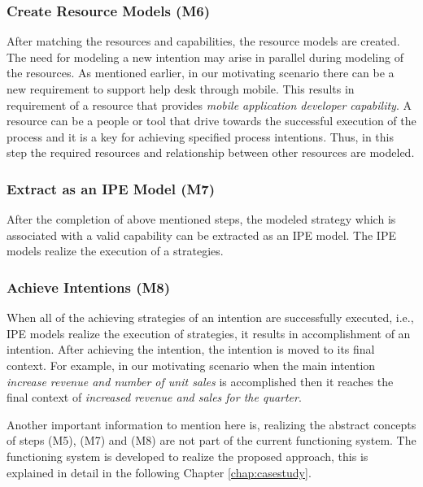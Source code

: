 \subsubsection{Create Resource Models (M6)}  
After matching the resources and capabilities, the resource models are created. The need for modeling a new intention may arise in parallel during modeling of the resources. As mentioned earlier, in our motivating scenario there can be a new requirement to support help desk through mobile. This results in requirement of a resource that provides \textit{mobile application developer capability}. A resource can be a people or tool that drive towards the successful execution of the process and it is a key for achieving specified process intentions. Thus, in this step the required resources and relationship between other resources are modeled.  

\subsubsection{Extract as an IPE Model (M7)}  
After the completion of above mentioned steps, the modeled strategy which is associated with a valid capability can be extracted as an IPE model. The IPE models realize the execution of a strategies. 

\subsubsection{Achieve Intentions (M8)}
When all of the achieving strategies of an intention are successfully executed, i.e., IPE models realize the execution of strategies, it results in accomplishment of an intention. After achieving the intention, the intention is moved to its final context. For example, in our motivating scenario when the main intention \textit{increase revenue and number of unit sales} is accomplished then it reaches the final context of \textit{increased revenue and sales for the quarter}. 

Another important information to mention here is, realizing the abstract concepts of steps (M5), (M7) and (M8) are not part of the current functioning system. The functioning system is developed to realize the proposed approach, this is explained in detail in the following Chapter \ref{chap:casestudy}. 
 
